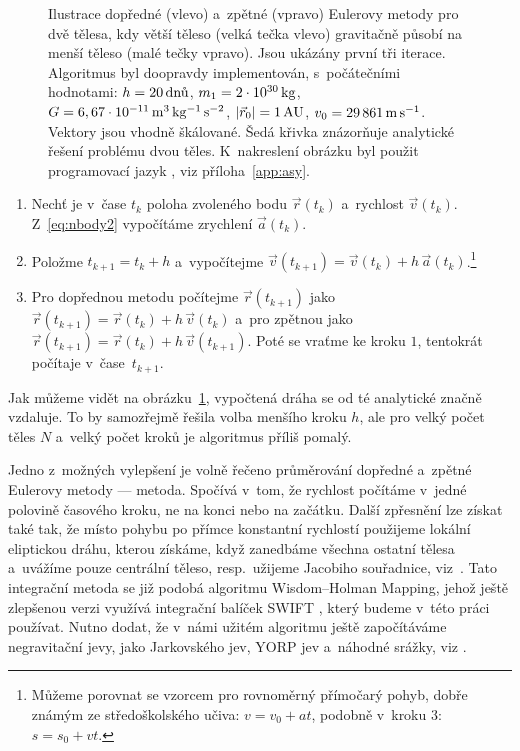 \documentclass[A4paper, 12pt, oneside, openany]{book}
\begin{document}
\begin{figure} 
	\centering 
	\begin{subfigure}[b]{0.45\textwidth}
	\end{subfigure}
	\begin{subfigure}[b]{0.45\textwidth}
	\end{subfigure}
	\caption{Ilustrace dopředné (vlevo) a~zpětné (vpravo) Eulerovy metody pro dvě tělesa, kdy větší těleso (velká tečka vlevo) gravitačně působí na menší těleso (malé tečky vpravo). Jsou ukázány první tři iterace. Algoritmus byl doopravdy implementován, s~počátečními hodnotami: $h=20\,{\rm \text{dnů}}$, $m_1=2\cdot10^{30}\,{\rm kg}$, $G=6,67\cdot10^{-11}\,{\rm m^3\,kg^{-1}\,s^{-2}}$, $|\vec{r}_0|=1\,{\rm AU}$, $v_0=29\,861\,{\rm m\,s^{-1}}$. Vektory jsou vhodně škálované. Šedá křivka znázorňuje analytické řešení problému dvou těles. K~nakreslení obrázku byl použit programovací jazyk , viz příloha~\ref{app:asy}.} \label{fig:euler}
\end{figure}
\pagebreak
\begin{enumerate}
	\item Nechť je v~čase $t_k$ poloha zvoleného bodu $\vec{r}(t_k)$ a~rychlost $\vec{v}(t_k)$. Z~\eqref{eq:nbody2} vypočítáme zrychlení $\vec{a}(t_k)$. 
	\item Položme $t_{k+1} = t_{k}+h$ a~vypočítejme $\vec{v}(t_{k+1}) = \vec{v}(t_k) + h\,\vec{a}(t_k)$.\footnote{Můžeme porovnat se vzorcem pro rovnoměrný přímočarý pohyb, dobře známým ze středoškolského učiva: $v = v_0 + at$, podobně v~kroku $3$: $s = s_0 + vt$.}
	\item Pro dopřednou metodu počítejme $\vec{r}(t_{k+1})$ jako $\vec{r}(t_{k+1}) = \vec{r}(t_k) + h\,\vec{v}(t_k)$ a~pro zpětnou jako $\vec{r}(t_{k+1}) = \vec{r}(t_k) + h\,\vec{v}(t_{k+1})$. Poté se vraťme ke kroku $1$, tentokrát počítaje v~čase~$t_{k+1}$. 
\end{enumerate}

Jak můžeme vidět na obrázku~\ref{fig:euler}, vypočtená dráha se od té analytické značně vzdaluje. To by samozřejmě řešila volba menšího kroku $h$, ale pro velký počet těles $N$ a~velký počet kroků je algoritmus příliš pomalý.

Jedno z~možných vylepšení je volně řečeno průměrování dopředné a~zpětné Eulerovy metody ---  metoda. Spočívá v~tom, že rychlost počítáme v~jedné polovině časového kroku, ne na konci nebo na začátku. Další zpřesnění lze získat také tak, že místo pohybu po přímce konstantní rychlostí použijeme lokální eliptickou dráhu, kterou získáme, když zanedbáme všechna ostatní tělesa a~uvážíme pouze centrální těleso, resp.\ užijeme Jacobiho souřadnice, viz~\cite{wisdom91}. Tato integrační metoda se již podobá algoritmu Wisdom--Holman Mapping, jehož ještě zlepšenou verzi využívá integrační balíček SWIFT \cite{levison94}, který budeme v~této práci používat. Nutno dodat, že v~námi užitém algoritmu ještě započítáváme negravitační jevy, jako Jarkovského jev, YORP jev a~náhodné srážky, viz \cite{broz11}.
\end{document}
